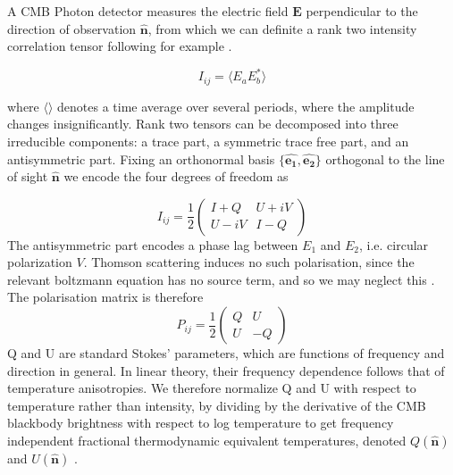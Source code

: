 \documentclass[a4paper,10pt]{article}
\renewcommand{\v}[1]{\mathbf{#1}}
\newcommand{\half}{\frac{1}{2}}
\newcommand{\unit}[1]{\hat{\v{#1}}}
\begin{document}
A CMB Photon detector measures the electric field $\v{E}$ perpendicular to the direction of observation $\hat{\v{n}}$, from which we can definite a rank two intensity correlation tensor following for example \cite{baldauf,lewis}.

\begin{equation}
I_{ij} = \langle E_aE_b^* \rangle
\end{equation}

where $\langle\rangle$ denotes a time average over several periods, where the amplitude changes insignificantly. Rank two tensors can be decomposed into three irreducible components: a trace part, a symmetric trace free part, and an antisymmetric part.  Fixing an orthonormal basis $\{\unit{e_1},\unit{e_2}\}$ orthogonal to the line of sight $\unit{n}$ we encode the four degrees of freedom as 


\begin{equation}
I_{ij} =
\half\begin{pmatrix}
I+Q & U+iV\\ 
U-iV & I-Q
\end{pmatrix}
\end{equation}
The antisymmetric part encodes a phase lag between $E_1$ and $E_2$, i.e. circular polarization $V$. Thomson scattering induces no such polarisation, since the relevant boltzmann equation has no source term, and so we may neglect this \cite{kowosky}. The polarisation matrix is therefore 
\begin{equation}
P_{ij} =\half \begin{pmatrix}
Q & U\\ 
U & -Q
\end{pmatrix}
\end{equation}
Q and U are standard Stokes' parameters, which are functions of frequency and direction in general. In linear theory, their frequency dependence follows that of temperature anisotropies. We therefore normalize Q and U with respect to temperature rather than intensity, by dividing by the derivative of the CMB blackbody brightness with respect to log temperature to get frequency independent fractional thermodynamic equivalent temperatures, denoted $Q(\unit{n})$ and $U(\unit{n})$ \cite{notes}. \\
\end{document}
